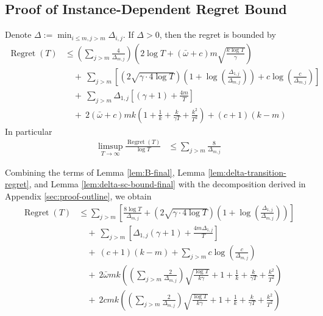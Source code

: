 \documentclass[opre,blindrev]{informs3}
\newcommand{\Regret}{\operatorname{Regret}}
\begin{document}
\begin{APPENDICES}
\section{Proof of Instance-Dependent Regret Bound}\label{sec:delta-all-constants}
\begin{theorem}
    Denote \(\Delta:=\min_{i\leq m, j>m}\Delta_{i,j}\). If \(\Delta>0\), then the regret is bounded by
    \begin{align*}
        \Regret(T)&\leq \left(\sum_{j>m}\frac{4}{\Delta_{m,j}}\right) \left( 2\log T+(\bar{\omega}+c)m\sqrt{\frac{k\log T}{\gamma }}\right)\\
        &\quad +~ \sum_{j>m} \left[\left(2\sqrt{\gamma \cdot 4\log T}\right)\left(1+\log\left(\frac{\Delta_{1,j}}{\Delta_{m,j}}\right)\right)+c\log\left(\frac{c}{\Delta_{m,j}}\right)\right]\\
        & \quad + ~\sum_{j>m} \Delta_{1,j} \left[(\gamma + 1) + \frac{4m}{T}\right]\\
        &\quad +~2(\bar{\omega}+c)mk\left(1+\frac{1}{k}+\frac{k}{\gamma T}+\frac{k^2}{T^2}\right) + (c+1)(k-m)
    \end{align*}
    In particular
    \begin{align*}
        \limsup_{T\to\infty}\frac{\Regret(T)}{\log T}&\leq \sum_{j>m} \frac{8}{\Delta_{m,j}}
    \end{align*}
\end{theorem}
    Combining the terms of Lemma \ref{lem:B-final}, Lemma \ref{lem:delta-transition-regret}, and Lemma \ref{lem:delta-sc-bound-final} with the decomposition derived in Appendix \ref{sec:proof-outline}, we obtain
    \begin{align*}
        \Regret(T)&\leq  \sum_{j>m} \left[\frac{8\log T}{\Delta_{m,j}}+ \left(2\sqrt{\gamma \cdot 4\log T}\right)\left(1+\log\left(\frac{\Delta_{1,j}}{\Delta_{m,j}}\right)\right)\right]\\
        & \quad + ~\sum_{j>m} \left[\Delta_{1,j}(\gamma + 1) + \frac{4m\Delta_{1,j}}{T}\right]\\
        &\quad +~ (c+1)(k-m) +\sum_{j>m}c\log\left(\frac{c}{\Delta_{m,j}}\right)\\
        &\quad + ~ 2\bar{\omega}mk\left(\left(\sum_{j>m}\frac{2}{\Delta_{m,j}}\right)\sqrt{\frac{\log T}{k\gamma}}+1+\frac{1}{k}+\frac{k}{\gamma T}+\frac{k^2}{T^2}\right)\\
        &\quad +~2cmk\left(\left(\sum_{j>m}\frac{2}{\Delta_{m,j}}\right)\sqrt{\frac{\log T}{k\gamma}}+1+\frac{1}{k}+\frac{k}{\gamma T}+\frac{k^2}{T^2}\right)

\end{align*}
\end{APPENDICES}
\end{document}
